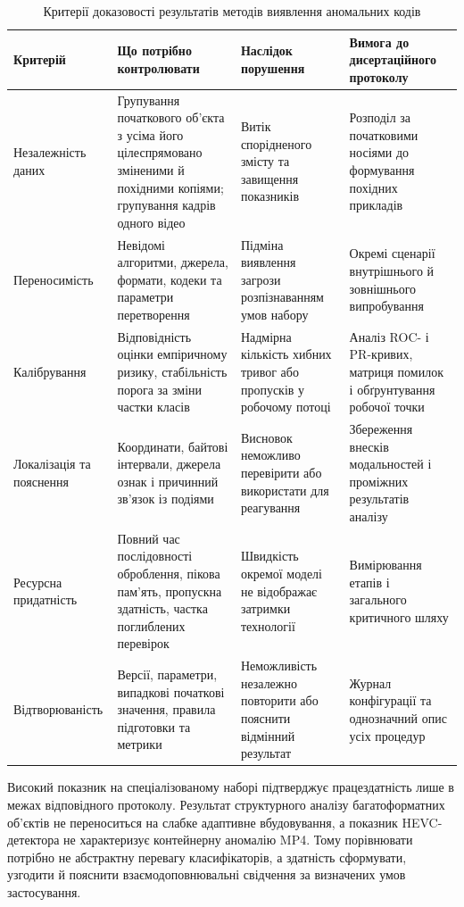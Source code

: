 \begin{table}[H]
\caption{Критерії доказовості результатів методів виявлення аномальних кодів}
\label{tab:evidence_quality}
\centering
\scriptsize
\begin{tabularx}{\textwidth}{>{\raggedright\arraybackslash}p{}>{\raggedright\arraybackslash}p{}YY}
\toprule
\textbf{Критерій} & \textbf{Що потрібно контролювати} & \textbf{Наслідок порушення} & \textbf{Вимога до дисертаційного протоколу} \\
\midrule
Незалежність даних & Групування початкового об’єкта з усіма його цілеспрямовано зміненими й похідними копіями; групування кадрів одного відео & Витік спорідненого змісту та завищення показників & Розподіл за початковими носіями до формування похідних прикладів \\
Переносимість & Невідомі алгоритми, джерела, формати, кодеки та параметри перетворення & Підміна виявлення загрози розпізнаванням умов набору & Окремі сценарії внутрішнього й зовнішнього випробування \\
Калібрування & Відповідність оцінки емпіричному ризику, стабільність порога за зміни частки класів & Надмірна кількість хибних тривог або пропусків у робочому потоці & Аналіз ROC- і PR-кривих, матриця помилок і обґрунтування робочої точки \\
Локалізація та пояснення & Координати, байтові інтервали, джерела ознак і причинний зв’язок із подіями & Висновок неможливо перевірити або використати для реагування & Збереження внесків модальностей і проміжних результатів аналізу \\
Ресурсна придатність & Повний час послідовності оброблення, пікова пам’ять, пропускна здатність, частка поглиблених перевірок & Швидкість окремої моделі не відображає затримки технології & Вимірювання етапів і загального критичного шляху \\
Відтворюваність & Версії, параметри, випадкові початкові значення, правила підготовки та метрики & Неможливість незалежно повторити або пояснити відмінний результат & Журнал конфігурації та однозначний опис усіх процедур \\
\bottomrule
\end{tabularx}
\end{table}

Високий показник на спеціалізованому наборі підтверджує працездатність лише в межах відповідного протоколу. Результат структурного аналізу багатоформатних об’єктів не переноситься на слабке адаптивне вбудовування, а показник HEVC-детектора не характеризує контейнерну аномалію MP4. Тому порівнювати потрібно не абстрактну перевагу класифікаторів, а здатність сформувати, узгодити й пояснити взаємодоповнювальні свідчення за визначених умов застосування.

